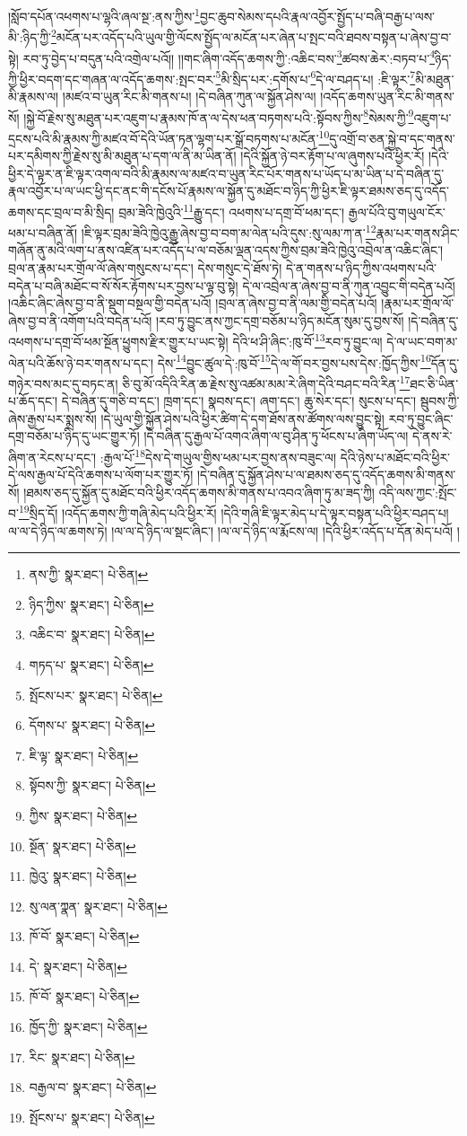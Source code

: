 །སློབ་དཔོན་འཕགས་པ་ལྷའི་ཞལ་སྔ་:ནས་ཀྱིས་\footnote{ནས་ཀྱི་  སྣར་ཐང་།  པེ་ཅིན། }བྱང་ཆུབ་སེམས་དཔའི་རྣལ་འབྱོར་སྤྱོད་པ་བཞི་བརྒྱ་པ་ལས་མི་:ཉིད་ཀྱི་\footnote{ཉིད་ཀྱིས་  སྣར་ཐང་།  པེ་ཅིན། }མངོན་པར་འདོད་པའི་ཡུལ་གྱི་ལོངས་སྤྱོད་ལ་མངོན་པར་ཞེན་པ་སྤང་བའི་ཐབས་བསྟན་པ་ཞེས་བྱ་བ་སྟེ། རབ་ཏུ་བྱེད་པ་བདུན་པའི་འགྲེལ་པའོ།། །།གང་ཞིག་འདོད་ཆགས་ཀྱི་:འཆིང་བས་\footnote{འཆིང་བ་  སྣར་ཐང་།  པེ་ཅིན། }ཚབས་ཆེར་:བཏབ་པ་\footnote{གཏད་པ་  སྣར་ཐང་།  པེ་ཅིན། }ཉིད་ཀྱི་ཕྱིར་བདག་དང་གཞན་ལ་འདོད་ཆགས་:སྤང་བར་\footnote{སྤོངས་པར་  སྣར་ཐང་།  པེ་ཅིན། }མི་སྲིད་པར་:དགོས་པ་\footnote{དོགས་པ་  སྣར་ཐང་།  པེ་ཅིན། }དེ་ལ་བཤད་པ། :ཇི་ལྟར་\footnote{ཇི་ལྟ་  སྣར་ཐང་།  པེ་ཅིན། }མི་མཐུན་མི་རྣམས་ལ། །མཛའ་བ་ཡུན་རིང་མི་གནས་པ། །དེ་བཞིན་ཀུན་ལ་སྐྱོན་ཤེས་ལ། །འདོད་ཆགས་ཡུན་རིང་མི་གནས་སོ། །སྐྱེ་བོ་རྗེས་སུ་མཐུན་པར་འཇུག་པ་རྣམས་ཁོ་ན་ལ་དེས་ཕན་བཏགས་པའི་:སྟོབས་ཀྱིས་\footnote{སྟོབས་ཀྱི་  སྣར་ཐང་།  པེ་ཅིན། }སེམས་ཀྱི་\footnote{ཀྱིས་  སྣར་ཐང་།  པེ་ཅིན། }འཇུག་པ་དྲངས་པའི་མི་རྣམས་ཀྱི་མཛའ་བོ་དེའི་ཡོན་ཏན་ལྷག་པར་སྒྲོ་བཏགས་པ་མངོན་\footnote{སྔོན་  སྣར་ཐང་།  པེ་ཅིན། }དུ་འགྲོ་བ་ཅན་སྐྱེ་བ་དང་གནས་པར་དམིགས་ཀྱི་རྗེས་སུ་མི་མཐུན་པ་དག་ལ་ནི་མ་ཡིན་ནོ། །དེའི་སྐྱོན་ཉེ་བར་རྟོག་པ་ལ་ཞུགས་པའི་ཕྱིར་རོ། །དེའི་ཕྱིར་དེ་ལྟར་ན་ཇི་ལྟར་འགལ་བའི་མི་རྣམས་ལ་མཛའ་བ་ཡུན་རིང་པོར་གནས་པ་ཡོད་པ་མ་ཡིན་པ་དེ་བཞིན་དུ་རྣལ་འབྱོར་པ་ལ་ཡང་ཕྱི་དང་ནང་གི་དངོས་པོ་རྣམས་ལ་སྐྱོན་དུ་མཐོང་བ་ཉིད་ཀྱི་ཕྱིར་ཇི་ལྟར་ཐམས་ཅད་དུ་འདོད་ཆགས་དང་བྲལ་བ་མི་སྲིད། བྲམ་ཟེའི་ཁྱེའུའི་\footnote{ཁྱེའུ་  སྣར་ཐང་།  པེ་ཅིན། }རྒྱུ་དང་། འཕགས་པ་དགྲ་བོ་ཕམ་དང་། རྒྱལ་པོའི་བུ་གཡུལ་ངོར་ཕམ་པ་བཞིན་ནོ། །ཇི་ལྟར་བྲམ་ཟེའི་ཁྱེའུ་རྒྱུ་ཞེས་བྱ་བ་བག་མ་ལེན་པའི་དུས་:སུ་ལམ་ཀ་ན་\footnote{སུ་ལན་ཀྣན་  སྣར་ཐང་།  པེ་ཅིན། }རྣམ་པར་གནས་ཤིང་གཞོན་ནུ་མའི་ལག་པ་ནས་འཛིན་པར་འདོད་པ་ལ་བཅོམ་ལྡན་འདས་ཀྱིས་བྲམ་ཟེའི་ཁྱེའུ་འབྲེལ་ན་འཆིང་ཞིང་། བྲལ་ན་རྣམ་པར་གྲོལ་ལོ་ཞེས་གསུངས་པ་དང་། དེས་གསུང་དེ་ཐོས་ཏེ། དེ་ན་གནས་པ་ཉིད་ཀྱིས་འཕགས་པའི་བདེན་པ་བཞི་མཐོང་བ་སོ་སོར་རྟོགས་པར་བྱས་པ་ལྟ་བུ་སྟེ། དེ་ལ་འབྲེལ་ན་ཞེས་བྱ་བ་ནི་ཀུན་འབྱུང་གི་བདེན་པའོ། །འཆིང་ཞིང་ཞེས་བྱ་བ་ནི་སྡུག་བསྔལ་གྱི་བདེན་པའོ། །བྲལ་ན་ཞེས་བྱ་བ་ནི་ལམ་གྱི་བདེན་པའོ། །རྣམ་པར་གྲོལ་ལོ་ཞེས་བྱ་བ་ནི་འགོག་པའི་བདེན་པའོ། །རབ་ཏུ་བྱུང་ནས་ཀྱང་དགྲ་བཅོམ་པ་ཉིད་མངོན་སུམ་དུ་བྱས་སོ། །དེ་བཞིན་དུ་འཕགས་པ་དགྲ་བོ་ཕམ་སྔོན་ཕྱུགས་རྫིར་གྱུར་པ་ཡང་སྟེ། དེའི་ཕ་ཤི་ཞིང་:ཁུ་བོ་\footnote{ཁོ་བོ་  སྣར་ཐང་།  པེ་ཅིན། }རབ་ཏུ་བྱུང་ལ། དེ་ལ་ཡང་བག་མ་ལེན་པའི་ཆོས་ཉེ་བར་གནས་པ་དང་། དེས་\footnote{དེ་  སྣར་ཐང་།  པེ་ཅིན། }བྱུང་ཚུལ་དེ་:ཁུ་བོ་\footnote{ཁོ་བོ་  སྣར་ཐང་།  པེ་ཅིན། }དེ་ལ་གོ་བར་བྱས་པས་དེས་:ཁྱོད་ཀྱིས་\footnote{ཁྱོད་ཀྱི་  སྣར་ཐང་།  པེ་ཅིན། }དོན་དུ་གཉེར་བས་མང་དུ་བཏང་ན། ཅི་བུ་མོ་འདིའི་རིན་ཆ་རྗེས་སུ་འཚམ་མམ་རེ་ཞིག་དེའི་བཤང་བའི་རིན་\footnote{རིང་  སྣར་ཐང་།  པེ་ཅིན། }ཐང་ཅི་ཡིན་པ་ཆོད་དང་། དེ་བཞིན་དུ་གཅི་བ་དང་། ཁྲག་དང་། སྣབས་དང་། ཞག་དང་། ཆུ་སེར་དང་། སུངས་པ་དང་། སྦུབས་ཀྱི་ཞེས་རྒྱས་པར་སྨྲས་སོ། །དེ་ཡུལ་གྱི་སྐྱོན་ཤེས་པའི་ཕྱིར་ཚིག་དེ་དག་ཐོས་ནས་ཚོགས་ལས་བྱུང་སྟེ། རབ་ཏུ་བྱུང་ཞིང་དགྲ་བཅོམ་པ་ཉིད་དུ་ཡང་གྱུར་ཏོ། །དེ་བཞིན་དུ་རྒྱལ་པོ་འགའ་ཞིག་ལ་བུ་ཤིན་ཏུ་ཕོངས་པ་ཞིག་ཡོད་ལ། དེ་ནས་རེ་ཞིག་ན་རེངས་པ་དང་། :རྒྱལ་པོ་\footnote{བརྒྱལ་བ་  སྣར་ཐང་།  པེ་ཅིན། }དེས་དེ་གཡུལ་གྱིས་ཕམ་པར་བྱས་ནས་བཟུང་ལ། དེའི་ཉེས་པ་མཐོང་བའི་ཕྱིར་དེ་ལས་རྒྱལ་པོ་དེའི་ཆགས་པ་ལོག་པར་གྱུར་ཏོ། །དེ་བཞིན་དུ་སྐྱོན་ཤེས་པ་ལ་ཐམས་ཅད་དུ་འདོད་ཆགས་མི་གནས་སོ། །ཐམས་ཅད་དུ་སྐྱོན་དུ་མཐོང་བའི་ཕྱིར་འདོད་ཆགས་མི་གནས་པ་འབའ་ཞིག་ཏུ་མ་ཟད་ཀྱི། འདི་ལས་ཀྱང་:སྤོང་བ་\footnote{སྤོངས་པ་  སྣར་ཐང་།  པེ་ཅིན། }སྲིད་དོ། །འདོད་ཆགས་ཀྱི་གཞི་མེད་པའི་ཕྱིར་རོ། །དེའི་གཞི་ཇི་ལྟར་མེད་པ་དེ་ལྟར་བསྟན་པའི་ཕྱིར་བཤད་པ། ལ་ལ་དེ་ཉིད་ལ་ཆགས་ཏེ། །ལ་ལ་དེ་ཉིད་ལ་སྡང་ཞིང་། །ལ་ལ་དེ་ཉིད་ལ་རྨོངས་ལ། །དེའི་ཕྱིར་འདོད་པ་དོན་མེད་པའོ། །
